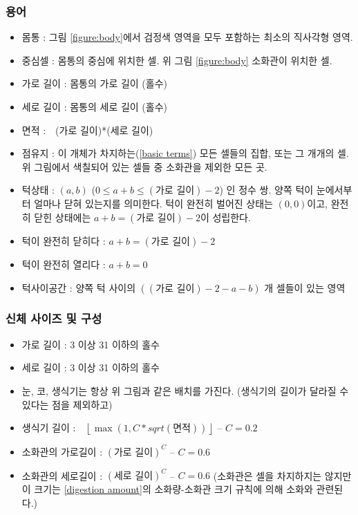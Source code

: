 \documentclass[a4paper,12pt]{article}
\newcommand{\floor}[1]{\left\lfloor{#1}\right\rfloor}
\begin{document}
\subsubsection{용어}\label{body terms}
\begin{itemize}
\item 몸통 : 그림 \ref{figure:body}에서 검정색 영역을 모두 포함하는 최소의 직사각형 영역. 
\item 중심셀 : 몸통의 중심에 위치한 셀. 위 그림 \ref{figure:body} 소화관이 위치한 셀.
\item 가로 길이 : 몸통의 가로 길이 (홀수)
\item 세로 길이 : 몸통의 세로 길이 (홀수)
\item 면적 :　(가로 길이)*(세로 길이)
\item 점유지 : 이 개체가 차지하는(\ref{basic terms}) 모든 셀들의 집합, 또는 그 개개의 셀. 위 그림에서 색칠되어 있는 셀들 중 소화관을 제외한 모든 곳.
\item 턱상태 : $(a,b)$ ($0\le a+b\le(\text{가로 길이})-2$) 인 정수 쌍. 양쪽 턱이 눈에서부터 얼마나 닫혀 있는지를 의미한다. 턱이 완전히 벌어진 상태는 $(0,0)$이고, 완전히 닫힌 상태에는 $a+b=(\text{가로 길이})-2$이 성립한다. 
\item 턱이 완전히 닫히다 : $a+b=(\text{가로 길이})-2$
\item 턱이 완전히 열리다 : $a+b=0$
\item 턱사이공간 : 양쪽 턱 사이의 $((\text{가로 길이})-2-a-b)$ 개 셀들이 있는 영역
\end{itemize}
\subsubsection{신체 사이즈 및 구성}\label{body size}
\begin{itemize}
\item 가로 길이 : 3 이상 31 이하의 홀수
\item 세로 길이 : 3 이상 31 이하의 홀수  
\item 눈, 코, 생식기는 항상 위 그림과 같은 배치를 가진다. (생식기의 길이가 달라질 수 있다는 점을 제외하고)
\item 생식기 길이 :　$\floor{\max(1, C*sqrt(\text{면적}))}$ -- $C=0.2$
\item 소화관의 가로길이 :  $(\text{가로 길이})^C$ -- $C=0.6$
\item 소화관의 세로길이 :  $(\text{세로 길이})^C$ -- $C=0.6$
\newline(소화관은 셀을 차지하지는 않지만 이 크기는 \ref{digestion amount}의 소화량-소화관 크기 규칙에 의해 소화와 관련된다.)
\end{itemize}
\end{document}
